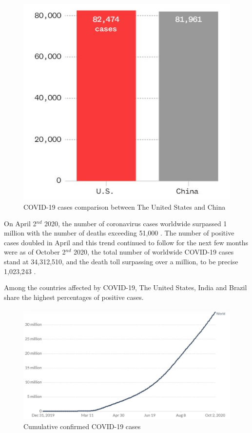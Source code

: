 \begin{figure}[th]
    \centering
    \includegraphics{Images/usCases.JPG}
    \decoRule
    \caption[COVID-19 Cases]{COVID-19 cases comparison between The United States and China \cite{GIV2020}}
    \label{fig:COVID-19 Cases Comparison}
    \end{figure}

On April 2$^{nd}$ 2020, the number of coronavirus cases worldwide surpassed 1 million with the number of deaths exceeding 51,000 \cite{PHI2020}. 
The number of positive cases doubled in April and this trend continued to follow for the next few months were as of 
October 2$^{nd}$ 2020, the total number of worldwide COVID-19 cases stand at 34,312,510, and the death toll surpassing over a million, to be precise 1,023,243 \cite{GGN2020}. 

Among the countries affected by COVID-19, The United States, India and Brazil share the 
highest percentages of positive cases.  

\begin{figure}[H]
    \centering
    \includegraphics[width=15cm, height=6cm]{Images/totalCases.JPG}
    \decoRule
    \caption[Total COVID-19 Cases]{Cumulative confirmed COVID-19 cases \cite{ECDC2020}}
    \label{fig:Total COVID-19 Cases}
    \end{figure}

